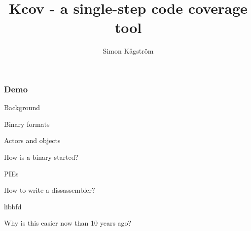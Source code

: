 \documentclass{beamer}
\title[Kcov - a single-step code coverage tool] %
{Kcov - a single-step code coverage tool}
\author{Simon Kågström}
\institute
{
  Consultant\\
  \texttt{https://github.com/SimonKagstrom/emilpro}
}
\begin{document}
\begin{frame}
  \titlepage
\end{frame}

\begin{frame}
  \frametitle{Demo}

\end{frame}


\begin{frame}{Background}
\end{frame}

\begin{frame}{Binary formats}
\end{frame}

\begin{frame}{Actors and objects}
\end{frame}

\begin{frame}{How is a binary started?}
\end{frame}

\begin{frame}{PIEs}
\end{frame}

\begin{frame}{How to write a dissassembler?}
\end{frame}

\begin{frame}{libbfd}
\end{frame}

\begin{frame}{Why is this easier now than 10 years ago?}
\end{frame}
\end{document}
